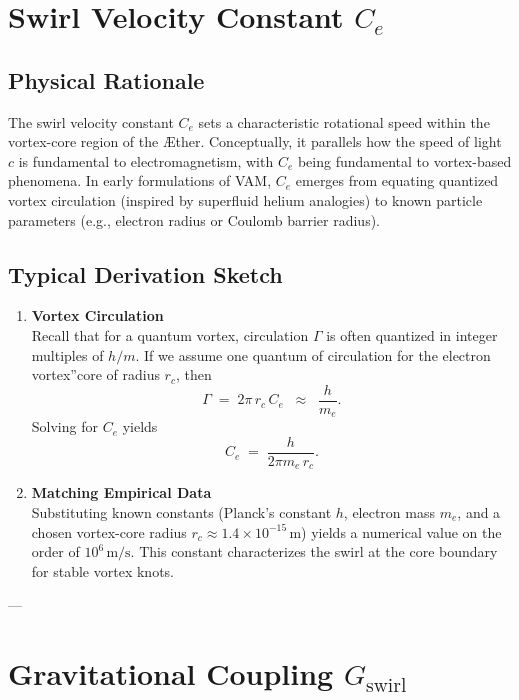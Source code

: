 \section{Swirl Velocity Constant \(C_e\)}

\subsection{Physical Rationale}
The swirl velocity constant \(C_e\) sets a characteristic rotational speed within the vortex-core region of the Æther. Conceptually, it parallels how the speed of light \(c\) is fundamental to electromagnetism, with \(C_e\) being fundamental to vortex-based phenomena. In early formulations of VAM, \(C_e\) emerges from equating quantized vortex circulation (inspired by superfluid helium analogies) to known particle parameters (e.g., electron radius or Coulomb barrier radius).

\subsection{Typical Derivation Sketch}
\begin{enumerate}
    \item \textbf{Vortex Circulation} \\
    Recall that for a quantum vortex, circulation \(\Gamma\) is often quantized in integer multiples of \(h/m\). If we assume one quantum of circulation for the \grqq electron vortex\textquotedblright core of radius \(r_c\), then
    \[
        \Gamma \;=\; 2 \pi \,r_c \,C_e \;\;\approx\;\; \frac{h}{m_e}.
    \]
    Solving for \(C_e\) yields
    \[
        C_e
        \;=\;
        \frac{h}{2 \pi m_e \,r_c}.
    \]

    \item \textbf{Matching Empirical Data} \\
    Substituting known constants (Planck's constant \(h\), electron mass \(m_e\), and a chosen vortex-core radius \(r_c\approx 1.4\times 10^{-15}\,\mathrm{m}\)) yields a numerical value on the order of \(10^6\,\mathrm{m/s}\). This constant characterizes the swirl at the core boundary for stable vortex knots.
\end{enumerate}

---

\section{Gravitational Coupling \(G_\text{swirl}\)}

